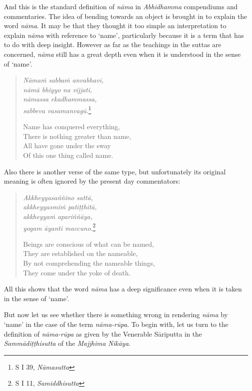 And this is the standard definition of \emph{nāma} in \emph{Abhidhamma} compendiums and commentaries. The idea of bending towards an object is brought in to explain the word \emph{nāma}. It may be that they thought it too simple an interpretation to explain \emph{nāma} with reference to `name', particularly because it is a term that has to do with deep insight. However as far as the teachings in the suttas are concerned, \emph{nāma} still has a great depth even when it is understood in the sense of `name'.

\begin{quote}
\emph{Nāmaṁ sabbaṁ anvabhavi,}\\
\emph{nāmā bhiyyo na vijjati,}\\
\emph{nāmassa ekadhammassa,}\\
\emph{sabbeva vasamanvagū}.\footnote{S I 39, \emph{Nāmasutta}}

Name has conquered everything,\\
There is nothing greater than name,\\
All have gone under the sway\\
Of this one thing called name.
\end{quote}

Also there is another verse of the same type, but unfortunately its original meaning is often ignored by the present day commentators:

\begin{quote}
\emph{Akkheyyasaññino sattā,}\\
\emph{akkheyyasmiṁ patiṭṭhitā,}\\
\emph{akkheyyaṁ apariññāya,}\\
\emph{yogam āyanti maccuno}.\footnote{S I 11, \emph{Samiddhisutta}}

Beings are conscious of what can be named,\\
They are established on the nameable,\\
By not comprehending the nameable things,\\
They come under the yoke of death.
\end{quote}

All this shows that the word \emph{nāma} has a deep significance even when it is taken in the sense of `name'.

But now let us see whether there is something wrong in rendering \emph{nāma} by `name' in the case of the term \emph{nāma-rūpa}. To begin with, let us turn to the definition of \emph{nāma-rūpa} as given by the Venerable Sāriputta in the \emph{Sammādiṭṭhisutta} of the \emph{Majjhima Nikāya}.

